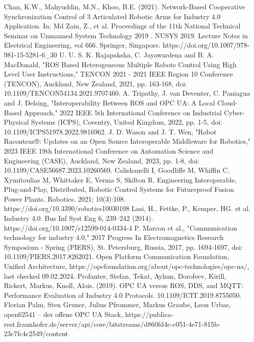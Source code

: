 \documentclass[conference]{IEEEtran}
\begin{document}
\begin{thebibliography}{00}
Chan, K.W., Mahyuddin, M.N., Khoo, B.E. (2021). Network-Based Cooperative Synchronization Control of 3 Articulated Robotic Arms for Industry 4.0 Application. In: Md Zain, Z., et al. Proceedings of the 11th National Technical Seminar on Unmanned System Technology 2019 . NUSYS 2019. Lecture Notes in Electrical Engineering, vol 666. Springer, Singapore. https://doi.org/10.1007/978-981-15-5281-6\_30
U. U. S. K. Rajapaksha, C. Jayawardena and B. A. MacDonald, "ROS Based Heterogeneous Multiple Robots Control Using High Level User Instructions," TENCON 2021 - 2021 IEEE Region 10 Conference (TENCON), Auckland, New Zealand, 2021, pp. 163-168, doi: 10.1109/TENCON54134.2021.9707460.
A. Tripathy, J. van Deventer, C. Paniagua and J. Delsing, "Interoperability Between ROS and OPC UA: A Local Cloud-Based Approach," 2022 IEEE 5th International Conference on Industrial Cyber-Physical Systems (ICPS), Coventry, United Kingdom, 2022, pp. 1-5, doi: 10.1109/ICPS51978.2022.9816962.
J. D. Wason and J. T. Wen, "Robot Raconteur®: Updates on an Open Source Interoperable Middleware for Robotics," 2023 IEEE 19th International Conference on Automation Science and Engineering (CASE), Auckland, New Zealand, 2023, pp. 1-8, doi: 10.1109/CASE56687.2023.10260569.
Caliskanelli I, Goodliffe M, Whiffin C, Xymitoulias M, Whittaker E, Verma S, Skilton R. Engineering Interoperable, Plug-and-Play, Distributed, Robotic Control Systems for Futureproof Fusion Power Plants. Robotics. 2021; 10(3):108. https://doi.org/10.3390/robotics10030108
Lasi, H., Fettke, P., Kemper, HG. et al. Industry 4.0. Bus Inf Syst Eng 6, 239–242 (2014). https://doi.org/10.1007/s12599-014-0334-4
 P. Marcon et al., "Communication technology for industry 4.0," 2017 Progress In Electromagnetics Research Symposium - Spring (PIERS), St. Petersburg, Russia, 2017, pp. 1694-1697, doi: 10.1109/PIERS.2017.8262021.
Open Platform Communication Foundation, Unified Architecture, https://opcfoundation.org/about/opc-technologies/opc-ua/, last checked 09.02.2024.
 Profanter, Stefan, Tekat, Ayhun, Dorofeev, Kirill, Rickert, Markus, Knoll, Alois. (2019). OPC UA versus ROS, DDS, and MQTT: Performance Evaluation of Industry 4.0 Protocols. 10.1109/ICIT.2019.8755050. 
Florian Palm, Sten Gruner, Julius Pfrommer, Markus Graube, Leon Urbas, open62541 – der offene OPC UA Stack, https://publica-rest.fraunhofer.de/server/api/core/bitstreams/d860fd4c-c051-4e71-815b-23c7fc4c2549/content

\end{thebibliography}
\end{document}
